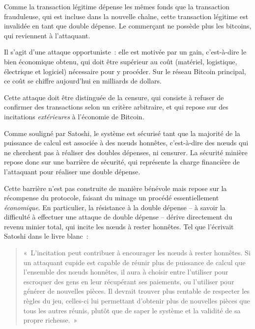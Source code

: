 Comme la transaction légitime dépense les mêmes fonds que la transaction frauduleuse, qui est incluse dans la nouvelle chaîne, cette transaction légitime est invalidée en tant que double dépense. Le commerçant ne possède plus les bitcoins, qui reviennent à l'attaquant.

Il s'agit d'une attaque opportuniste~: elle est motivée par un gain, c'est-à-dire le bien économique obtenu, qui doit être supérieur au coût (matériel, logistique, électrique et logiciel) nécessaire pour y procéder. Sur le réseau Bitcoin principal, ce coût se chiffre aujourd'hui en milliards de dollars.

Cette attaque doit être distinguée de la censure, qui consiste à refuser de confirmer des transactions selon un critère arbitraire, et qui repose sur des incitations \emph{extérieures} à l'économie de Bitcoin.


Comme souligné par Satoshi, le système est sécurisé tant que la majorité de la puissance de calcul est associée à des nœuds honnêtes, c'est-à-dire des nœuds qui ne cherchent pas à réaliser des doubles dépenses, ni censurer. La sécurité minière repose donc sur une barrière de sécurité, qui représente la charge financière de l'attaquant pour réaliser une double dépense.

Cette barrière n'est pas construite de manière bénévole mais repose sur la récompense du protocole, faisant du minage un procédé essentiellement \emph{économique}. En particulier, la résistance à la double dépense -- à savoir la difficulté à effectuer une attaque de double dépense -- dérive directement du revenu minier total, qui incite les nœuds à rester honnêtes. Tel que l'écrivait Satoshi dans le livre blanc~:

\begin{quote}
«~L'incitation peut contribuer à encourager les nœuds à rester honnêtes. Si un attaquant cupide est capable de réunir plus de puissance de calcul que l'ensemble des nœuds honnêtes, il aura à choisir entre l'utiliser pour escroquer des gens en leur récupérant ses paiements, ou l'utiliser pour générer de nouvelles pièces. Il devrait trouver plus rentable de respecter les règles du jeu, celles-ci lui permettant d'obtenir plus de nouvelles pièces que tous les autres réunis, plutôt que de saper le système et la validité de sa propre richesse.~»
\end{quote}


